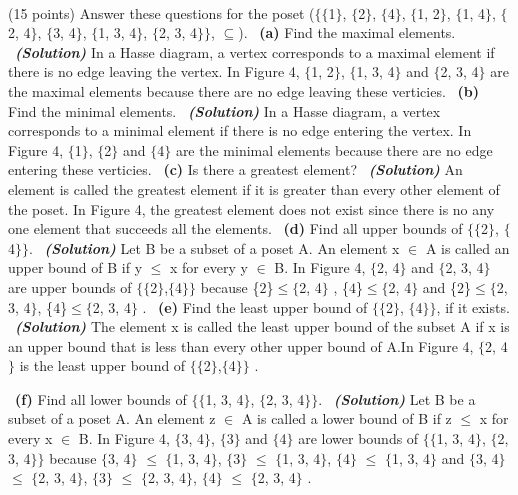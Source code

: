 \documentclass[a4 paper]{article}
\numberwithin{equation}{section}
\newcommand{\problem}[2]{~\\\fbox{\textbf{Problem #1}}\hfill (#2 points)\newline\newline}
\newcommand{\subproblem}[1]{~\newline\textbf{(#1)}}
\newcommand{\solution}{~\newline\textbf{\textit{(Solution)}} }
\newcommand{\0}{\mathbf{0}}
\begin{document}
\newpage

\problem{2: Relations}{15}
Answer these questions for the poset ($\{\{$1$\}$, $\{$2$\}$, $\{$4$\}$, $\{$1, 2$\}$, $\{$1, 4$\}$, $\{$2, 4$\}$, $\{$3, 4$\}$, $\{$1, 3, 4$\}$, $\{$2, 3, 4$\}\}$, $\subseteq$).
\newline
\subproblem{a} Find the maximal elements.
\solution
In a Hasse diagram, a vertex corresponds to a maximal element if there is no edge leaving the vertex.
In Figure 4, $\{$1, 2$\}$, $\{$1, 3, 4$\}$ and $\{$2, 3, 4$\}$ are the maximal elements because there are no edge leaving these verticies.
\newline
\subproblem{b} Find the minimal elements.
\solution
In a Hasse diagram, a vertex corresponds to a minimal element if there is no edge entering the vertex.
In Figure 4, $\{$1$\}$, $\{$2$\}$ and $\{$4$\}$ are the minimal elements because there are no edge entering these verticies.
\newline
\subproblem{c} Is there a greatest element?
\solution
An element is called the greatest element if it is greater than every other element of the poset. In Figure 4, the greatest element does not exist since there is no any one element that succeeds all the elements.
\newline
\subproblem{d} Find all upper bounds of $\{\{$2$\}$, $\{$4$\}\}$.
\solution
Let B be a subset of a poset A. An element x $\in$ A is called an upper bound of B if y $\leq$ x for every y $\in$ B.
In Figure 4, $\{$2, 4$\}$ and $\{$2, 3, 4$\}$ are upper bounds of $\{\{$2$\}$,$\{$4$\}\}$ because \{$2$\}$\leq$$\{$2, 4$\}$ , \{$4$\}$\leq$$\{$2, 4$\}$ and \newline \{$2$\}$\leq$$\{$2, 3, 4$\}$, \{$4$\}$\leq$$\{$2, 3, 4$\}$ .
\newline
\subproblem{e} Find the least upper bound of $\{\{$2$\}$, $\{$4$\}\}$, if it exists.
\solution
The element x is called the least upper bound of the subset A if x is an upper bound that
is less than every other upper bound of A.In Figure 4, $\{$2, 4$\}$ is the least upper bound of $\{\{$2$\}$,$\{$4$\}\}$ .

\subproblem{f} Find all lower bounds of $\{\{$1, 3, 4$\}$, $\{$2, 3, 4$\}\}$.
\solution
Let B be a subset of a poset A. An element z $\in$ A is called a lower bound of B if z $\leq$ x for every x $\in$ B. In Figure 4, $\{$3, 4$\}$, $\{$3$\}$ and $\{$4$\}$ are lower bounds of $\{\{$1, 3, 4$\}$, $\{$2, 3, 4$\}\}$ because $\{$3, 4$\}$ $\leq$ $\{$1, 3, 4$\}$, $\{$3$\}$ $\leq$ $\{$1, 3, 4$\}$,  $\{$4$\}$ $\leq$ $\{$1, 3, 4$\}$ and $\{$3, 4$\}$ $\leq$ $\{$2, 3, 4$\}$, $\{$3$\}$ $\leq$ $\{$2, 3, 4$\}$,  $\{$4$\}$ $\leq$ $\{$2, 3, 4$\}$ .
\end{document}
